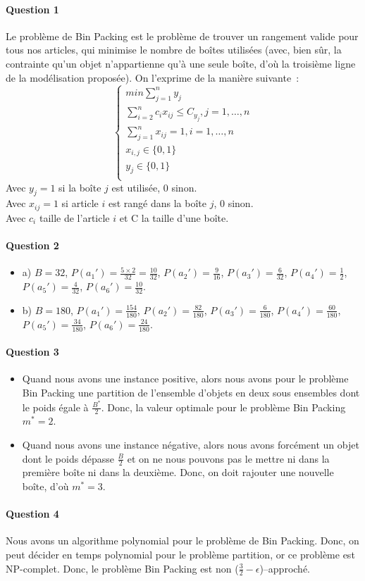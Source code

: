 \paragraph{Question 1}

Le problème de Bin Packing est le problème de trouver un rangement
valide pour tous nos articles, qui minimise le nombre de boîtes
utilisées (avec, bien sûr, la contrainte qu'un objet n'appartienne
qu'à une seule boîte, d'où la troisième ligne de la modélisation
proposée).  On l'exprime de la manière suivante~:
\begin{equation}
\begin{cases}
min \sum_{j=1}^{n}y_j \\
\sum_{i=2}^{n} c_ix_{ij} \leq C_{y_j}, j = 1, \dots, n \\
\sum_{j=1}^{n}x_{ij}=1, i=1, \dots, n \\
x_{i,j} \in \{ 0,1 \} \\
y_j \in \{ 0,1 \} \\
\end{cases}
\end{equation}
Avec $y_j = 1$ si la boîte $j$ est utilisée, 0 sinon. \\
Avec $x_{ij} = 1 $ si article $i$ est rangé dans la boîte $j$, 0
sinon. \\
Avec $c_i$ taille de l'article $i$ et C la taille d'une boîte.


\paragraph{Question 2}
\begin{itemize}
\item a) $B = 32$, $P(a_1') = \frac{5 \times 2}{32} = \frac{10}{32}$,
  $P(a_2') = \frac{9}{16}$, $P(a_3')=\frac{6}{32}$,
  $P(a_4')=\frac{1}{2}$, $P(a_5')=\frac{4}{32}$, $P(a_6')=\frac{10}{32}$.
\item b) $B = 180$, $P(a_1') = \frac{154}{180}$,
  $P(a_2') = \frac{82}{180}$, $P(a_3')=\frac{6}{180}$,
  $P(a_4')=\frac{60}{180}$, $P(a_5')=\frac{34}{180}$, $P(a_6')=\frac{24}{180}$.
\end{itemize}

\paragraph{Question 3}
\begin{itemize}
\item Quand nous avons une instance positive, alors nous avons pour le problème Bin Packing une partition de l'ensemble d'objets en deux sous ensembles dont le poids égale à $\frac{B^{*}}{2}$. Donc, la valeur optimale pour le problème Bin Packing $m^{*} = 2$. 
\item Quand nous avons une instance négative, alors nous avons forcément un objet dont le poids dépasse $\frac{B}{2}$ et on ne nous pouvons pas le mettre ni dans la première boîte ni dans la deuxième. Donc, on doit rajouter une nouvelle boîte, d'où $m^{*} = 3$.
\end{itemize}
\paragraph{Question 4}
Nous avons un algorithme polynomial pour le problème de Bin Packing. Donc, on peut décider en temps polynomial pour le problème partition, or ce problème est NP-complet. Donc, le problème Bin Packing est non ($\frac{3}{2} - \epsilon $)--approché.


